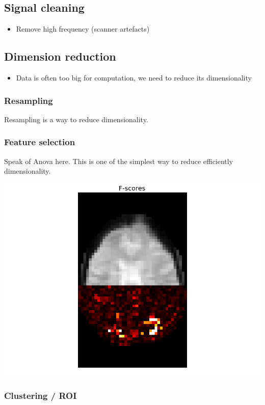 \documentclass{frontiersSCNS} %
\begin{document}
\subsection{Signal cleaning}

\begin{itemize}
    \item Remove high frequency (scanner artefacts)
\end{itemize}


\subsection{Dimension reduction}

\begin{itemize}
    \item Data is often too big for computation, we need to reduce its
        dimensionality
\end{itemize}

\subsubsection{Resampling}

Resampling is a way to reduce dimensionality.

\subsubsection{Feature selection}

Speak of Anova here. This is one of the simplest way to reduce efficiently
dimensionality.

\includegraphics[width=.5\linewidth]{img/plot_haxby_searchlight_2.png}

\subsubsection{Clustering / ROI}
\end{document}
